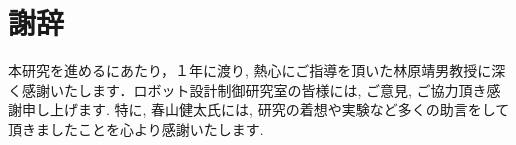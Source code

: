 \chapter*{謝辞}

本研究を進めるにあたり，１年に渡り, 熱心にご指導を頂いた林原靖男教授に深く感謝いたします．ロボット設計制御研究室の皆様には, ご意見, ご協力頂き感謝申し上げます. 特に, 春山健太氏には, 研究の着想や実験など多くの助言をして頂きましたことを心より感謝いたします.
%
